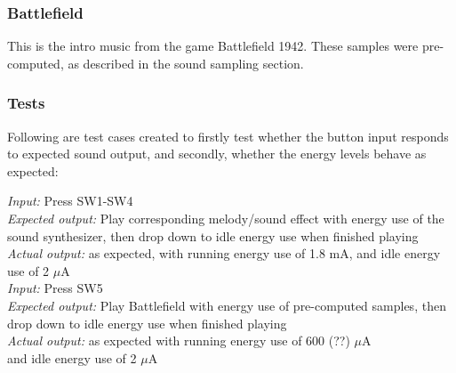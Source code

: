 \subsubsection{Battlefield}

This is the intro music from the game Battlefield 1942. These samples were pre-computed, as described in the sound sampling section. 

\subsubsection{Tests}

Following are test cases created to firstly test whether the button input responds to expected sound output, and secondly, whether the energy levels behave as expected:



\emph{Input: } Press SW1-SW4\\
\emph{Expected output: } Play corresponding melody/sound effect with energy use of the sound synthesizer, then drop down to idle energy use when finished playing\\
\emph{Actual output: } as expected, with running energy use of 1.8 mA, and idle energy use of 2 $\mu$A \\


\emph{Input: } Press SW5\\
\emph{Expected output: } Play Battlefield with energy use of pre-computed samples, then drop down to idle energy use when finished playing\\
\emph{Actual output: } as expected with running energy use of 600 (??) $\mu$A \\ and idle energy use of 2 $\mu$A \\ 
